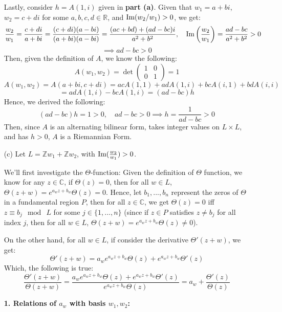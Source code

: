 \documentclass{article}
\begin{document}
\begin{itemize}
    Lastly, consider $h=A(1,i)$ given in \textbf{part (a)}. Given that $w_1=a+bi$, $w_2=c+di$ for some $a,b,c,d\in\mathbb{R}$, and $\textmd{Im}(w_2/w_1)>0$, we get:
    $$\frac{w_2}{w_1}=\frac{c+di}{a+bi}=\frac{(c+di)(a-bi)}{(a+bi)(a-bi)} = \frac{(ac+bd)+(ad-bc)i}{a^2+b^2},\quad \textmd{Im}\left(\frac{w_2}{w_1}\right)=\frac{ad-bc}{a^2+b^2}>0$$
    $$\implies ad-bc > 0$$
    Then, given the definition of $A$, we know the following:
    $$A(w_1,w_2) = \det\begin{pmatrix}1&0\\0&1\end{pmatrix} = 1$$
    $$A(w_1,w_2)=A(a+bi,c+di) = acA(1,1)+ adA(1,i)+bcA(i,1)+bdA(i,i)$$
    $$ = adA(1,i)-bcA(1,i) = (ad-bc)h$$
    Hence, we derived the following:
    $$(ad-bc)h = 1 >0,\quad ad-bc >0\implies h = \frac{1}{ad-bc}>0$$
    Then, since $A$ is an alternating bilinear form, takes integer values on $L\times L$, and has $h>0$, $A$ is a Riemannian Form.

    \hfil

    \hfil

    \item[(c)] Let $L=\mathbb{Z}w_1+\mathbb{Z}w_2$, with $\textmd{Im}(\frac{w_2}{w_1})>0$. 
    
    We'll first investigate the $\Theta$-function: Given the definition of $\Theta$ function, we know for any $z\in \mathbb{C}$, if $\Theta(z)=0$, then for all $w\in L$, $\Theta(z+w)=e^{a_wz+b_w}\Theta(z) = 0$. Hence, let $b_1,...,b_n$ represent the zeros of $\Theta$ in a fundamental region $P$, then for all $z\in\mathbb{C}$, we get $\Theta(z)=0$ iff $z\equiv b_j\mod\ L$ for some $j\in\{1,...,n\}$ (since if $z\in P$ satisfies $z\neq b_j$ for all index $j$, then for all $w\in L$, $\Theta(z+w)=e^{a_wz+b_w}\Theta(z)\neq 0$).
    
    On the other hand, for all $w\in L$, if consider the derivative $\Theta'(z+w)$, we get:
    $$\Theta'(z+w) = a_we^{a_wz+b_w}\Theta(z) + e^{a_wz+b_w}\Theta'(z)$$
    Which, the following is true:
    $$\frac{\Theta'(z+w)}{\Theta(z+w)}=\frac{a_we^{a_wz+b_w}\Theta(z) + e^{a_wz+b_w}\Theta'(z)}{e^{a_wz+b_w}\Theta(z)} = a_w+\frac{\Theta'(z)}{\Theta(z)}$$

    \hfil

    \textbf{1. Relations of $a_w$ with basis $w_1,w_2$:}


\end{itemize}
\end{document}
